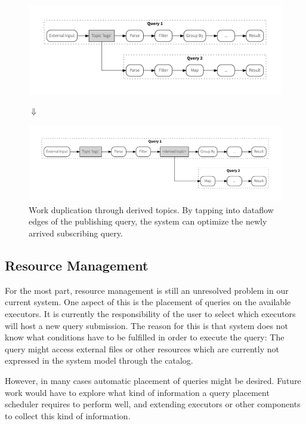 \begin{figure}[!htb]
  \includegraphics[scale=0.36]{figures/composition/q1q2_man}
  \vspace{-1.5em}
  \begin{center}
  $\Downarrow$
  \end{center}
  \vspace{-1.2em}
  \includegraphics[scale=0.36]{figures/composition/q1q2_auto}
  \caption[Work duplication through derived topics]{
  Work duplication through derived topics. By tapping into dataflow edges
  of the publishing query, the system can optimize the newly arrived
  subscribing query.}
  \label{fig:queryoptimization}
\end{figure}




\subsection{Resource Management}

For the most part, resource management is still an unresolved problem in our
current system. One aspect of this is the placement of queries on the available
executors. It is currently the responsibility of the user to select which executors
will host a new query submission.
The reason for this is that system does not know what conditions have to be
fulfilled in order to execute the query:
The query might access external files or other resources which are currently not
expressed in the system model through the catalog.

However, in many cases automatic placement of queries might be desired. Future
work would have to explore what kind of information a query placement scheduler
requires to perform well, and extending executors or other components to collect
this kind of information.


